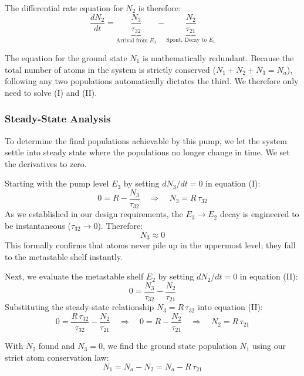 The differential rate equation for $N_2$ is therefore:
\begin{equation}
    \frac{dN_2}{dt} = \underbrace{\frac{N_3}{\tau_{32}}}_{\text{Arrival from } E_3} - \underbrace{\frac{N_2}{\tau_{21}}}_{\text{Spont. Decay to } E_1} \tag{II}
\end{equation}

The equation for the ground state $N_1$ is mathematically redundant. Because the total number of atoms in the system is strictly conserved ($N_1 + N_2 + N_3 = N_a$), following any two populations automatically dictates the third. We therefore only need to solve \textup{(I)} and \textup{(II)}.

\subsubsection*{Steady-State Analysis}

To determine the final populations achievable by this pump, we let the system settle into steady state where the populations no longer change in time. We set the derivatives to zero.

Starting with the pump level $E_3$ by setting $dN_3/dt = 0$ in equation \textup{(I)}:
\begin{equation*}
    0 = R - \frac{N_3}{\tau_{32}} \quad \Longrightarrow \quad N_3 = R\,\tau_{32}
\end{equation*}
As we established in our design requirements, the $E_3 \to E_2$ decay is engineered to be instantaneous ($\tau_{32} \to 0$). Therefore:
\begin{equation*}
    N_3 \approx 0
\end{equation*}
This formally confirms that atoms never pile up in the uppermost level; they fall to the metastable shelf instantly.

Next, we evaluate the metastable shelf $E_2$ by setting $dN_2/dt = 0$ in equation \textup{(II)}:
\begin{equation*}
    0 = \frac{N_3}{\tau_{32}} - \frac{N_2}{\tau_{21}}
\end{equation*}
Substituting the steady-state relationship $N_3 = R\,\tau_{32}$ into equation \textup{(II)}:
\begin{equation*}
    0 = \frac{R\,\tau_{32}}{\tau_{32}} - \frac{N_2}{\tau_{21}} \quad \Longrightarrow \quad 0 = R - \frac{N_2}{\tau_{21}} \quad \Longrightarrow \quad N_2 = R\,\tau_{21}
\end{equation*}

With $N_2$ found and $N_3 = 0$, we find the ground state population $N_1$ using our strict atom conservation law:
\begin{equation*}
    N_1 = N_a - N_2 = N_a - R\,\tau_{21}
\end{equation*}

